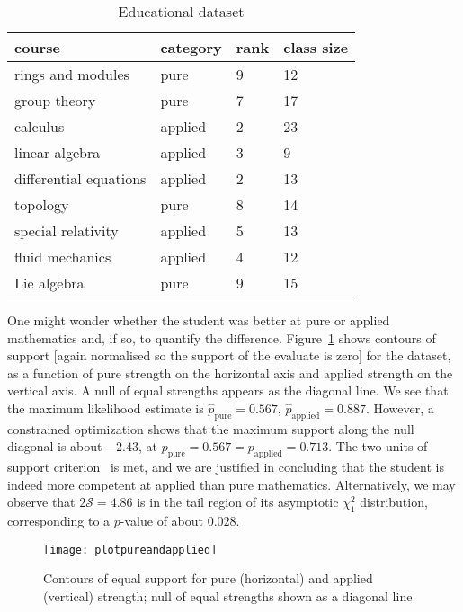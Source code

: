 \documentclass[article]{ajs}
\begin{document}
\begin{table*}[t]
  \caption{Educational dataset}
\label{educationtable}
\begin{tabular}{llll}
\hline
                   course&category   &rank&class size\\ \hline
      rings and modules  &  pure     & 9  &      12\\
           group theory  &  pure     & 7  &      17\\
               calculus  & applied   & 2  &      23\\
         linear algebra  & applied   & 3  &       9\\
 differential equations  & applied   & 2  &      13\\
               topology  &   pure    & 8  &      14\\
     special relativity  & applied   & 5  &      13\\
        fluid mechanics  & applied   & 4  &      12\\
            Lie algebra  &   pure    & 9  &      15\\
     \hline
\end{tabular}
\end{table*}

One might wonder whether the student was better at pure or applied
mathematics and, if so, to quantify the difference.
Figure~\ref{plotpureandapplied} shows contours of support [again
  normalised so the support of the evaluate is zero] for the dataset,
as a function of pure strength on the horizontal axis and applied
strength on the vertical axis.  A null of equal strengths appears as
the diagonal line.  We see that the maximum likelihood estimate is
$\hat{p}_\mathrm{pure}=0.567$, $\hat{p}_\mathrm{applied}=0.887$.
However, a constrained optimization shows that the maximum support
along the null diagonal is about $-2.43$, at
${p}_\mathrm{pure}=0.567={p}_\mathrm{applied}=0.713$.  The two units
of support criterion~\citep{edwards1972} is met, and we are justified
in concluding that the student is indeed more competent at applied
than pure mathematics.  Alternatively, we may observe that
$2\mathcal{S}=4.86$ is in the tail region of its asymptotic $\chi^2_1$
distribution, corresponding to a $p$-value of about $0.028$.

\begin{figure}
\begin{centering}
\texttt{[image: plotpureandapplied]}  %
\caption{Contours of equal support for pure (horizontal) and applied
  (vertical) strength; null of equal strengths shown as a diagonal
  line \label{plotpureandapplied}}
\end{centering}
\end{figure}
\end{document}

